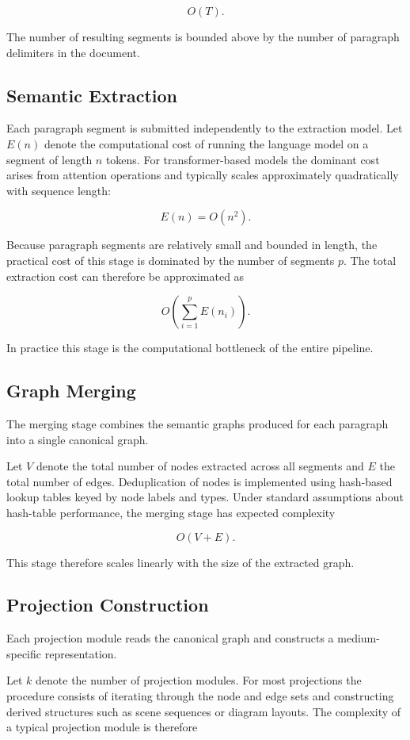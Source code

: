 \documentclass[12pt, a4paper]{article}
\begin{document}
\[
O(T).
\]

The number of resulting segments is bounded above by the number of paragraph delimiters in the document.

\subsection{Semantic Extraction}

Each paragraph segment is submitted independently to the extraction model. Let $E(n)$ denote the computational cost of running the language model on a segment of length $n$ tokens. For transformer-based models the dominant cost arises from attention operations and typically scales approximately quadratically with sequence length:

\[
E(n) = O(n^2).
\]

Because paragraph segments are relatively small and bounded in length, the practical cost of this stage is dominated by the number of segments $p$. The total extraction cost can therefore be approximated as

\[
O\!\left(\sum_{i=1}^{p} E(n_i)\right).
\]

In practice this stage is the computational bottleneck of the entire pipeline.

\subsection{Graph Merging}

The merging stage combines the semantic graphs produced for each paragraph into a single canonical graph.

Let $V$ denote the total number of nodes extracted across all segments and $E$ the total number of edges. Deduplication of nodes is implemented using hash-based lookup tables keyed by node labels and types. Under standard assumptions about hash-table performance, the merging stage has expected complexity

\[
O(V + E).
\]

This stage therefore scales linearly with the size of the extracted graph.

\subsection{Projection Construction}

Each projection module reads the canonical graph and constructs a medium-specific representation.

Let $k$ denote the number of projection modules. For most projections the procedure consists of iterating through the node and edge sets and constructing derived structures such as scene sequences or diagram layouts. The complexity of a typical projection module is therefore
\end{document}

